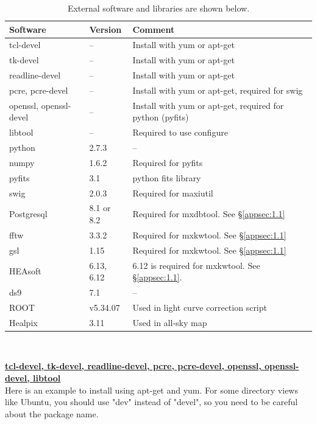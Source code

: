 \documentclass[10pt]{report}
\renewcommand{\_}{\textscale{.5}{\textbf{\textunderscore}}}
\begin{document}
\begin{table}[hbtp!]
\caption{External software and libraries are shown below.}
\label{tab:3.1}
\centering
\begin{tabu} to \textwidth{lll}
\hline \hline
\textbf{Software} & \textbf{Version} & \textbf{Comment} \\
\hline
tcl-devel & -- & Install with yum or apt-get \\
tk-devel & -- & Install with yum or apt-get \\
readline-devel & -- & Install with yum or apt-get \\
pcre, pcre-devel & -- & Install with yum or apt-get, required for swig \\
openssl, openssl-devel & -- & Install with yum or apt-get, required for python (pyfits) \\
libtool  & -- & Required to use configure \\
\hline
python & 2.7.3 & -- \\
numpy & 1.6.2 & Required for pyfits \\
pyfits & 3.1 & python fits library \\
swig & 2.0.3 & Required for maxiutil \\
Postgresql  & 8.1 or 8.2 & Required for mxdbtool. See \S\ref{appsec:1.1} \\
fftw & 3.3.2 &  Required for mxkwtool. See \S\ref{appsec:1.1}\\
gsl & 1.15 & Required for mxkwtool. See \S\ref{appsec:1.1} \\
\hline
HEAsoft  & 6.13, 6.12 & 6.12 is required for mxkwtool. See \S\ref{appsec:1.1}. \\
ds9  & 7.1 & -- \\
ROOT    & v5.34.07 & Used in light curve correction script \\
Healpix  & 3.11 & Used in all-sky map \\
\hline
\end{tabu}
\end{table}

\

\noindent\underline{\textbf{tcl-devel, tk-devel, readline-devel, pcre, pcre-devel, openssl, openssl-devel, libtool}}\\

\noindent Here is an example to install using apt-get and yum. For some directory views like Ubuntu, you should use "dev" instead of "devel", so you need to be careful about the package name. \\
\end{document}

